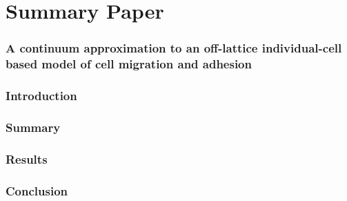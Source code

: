 \documentclass[12pt,letterpaper,cm]{article}
\renewcommand{\.}{\cdot}
\newcommand{\<}{\langle}
\renewcommand{\>}{\rangle}
\begin{document}
	
	
	\newpage
	
	
	
	
	\part*{Summary Paper}
	\section*{A continuum approximation to an off-lattice individual-cell based model of cell migration and adhesion \cite{Middleton2014} }
	
	
	
	\section*{Introduction}
	
	
	
	\section*{Summary}
	
	
	
	\section*{Results}	
	
	
	
	\section*{Conclusion}
	
	\printbibliography
	
	
	
\end{document}
